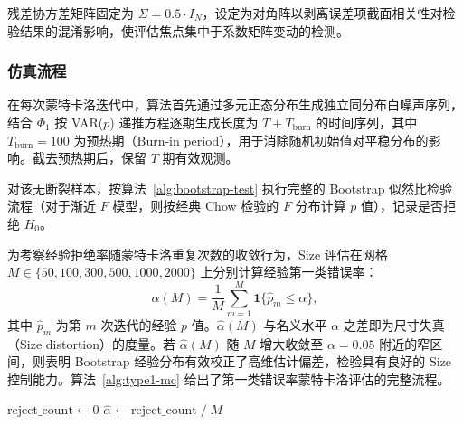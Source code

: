 残差协方差矩阵固定为 $\Sigma = 0.5 \cdot I_N$，设定为对角阵以剥离误差项截面相关性对检验结果的混淆影响，使评估焦点集中于系数矩阵变动的检测。

\subsubsection{仿真流程}

在每次蒙特卡洛迭代中，算法首先通过多元正态分布生成独立同分布白噪声序列，结合 $\Phi_1$ 按 VAR($p$) 递推方程逐期生成长度为 $T + T_{\text{burn}}$ 的时间序列，其中 $T_{\text{burn}} = 100$ 为预热期（Burn-in period），用于消除随机初始值对平稳分布的影响。截去预热期后，保留 $T$ 期有效观测。

对该无断裂样本，按算法~\ref{alg:bootstrap-test} 执行完整的 Bootstrap 似然比检验流程（对于渐近 $F$ 模型，则按经典 Chow 检验的 $F$ 分布计算 $p$ 值），记录是否拒绝 $H_0$。

为考察经验拒绝率随蒙特卡洛重复次数的收敛行为，Size 评估在网格 $M \in \{50, 100, 300, 500, 1000, 2000\}$ 上分别计算经验第一类错误率：
\begin{equation}\label{eq:type1-rate}
    \hat{\alpha}(M) = \frac{1}{M} \sum_{m=1}^{M} \mathbf{1}\{\hat{p}_m \leq \alpha\},
\end{equation}
其中 $\hat{p}_m$ 为第 $m$ 次迭代的经验 $p$ 值。$\hat{\alpha}(M)$ 与名义水平 $\alpha$ 之差即为尺寸失真（Size distortion）的度量。若 $\hat{\alpha}(M)$ 随 $M$ 增大收敛至 $\alpha = 0.05$ 附近的窄区间，则表明 Bootstrap 经验分布有效校正了高维估计偏差，检验具有良好的 Size 控制能力。算法~\ref{alg:type1-mc} 给出了第一类错误率蒙特卡洛评估的完整流程。

\begin{algorithm}[htbp]
\caption{第一类错误率的蒙特卡洛评估}\label{alg:type1-mc}
\BlankLine
$\mathrm{reject\_count} \leftarrow 0$\;
$\hat{\alpha} \leftarrow \mathrm{reject\_count} \;/\; M$\;
\end{algorithm}


